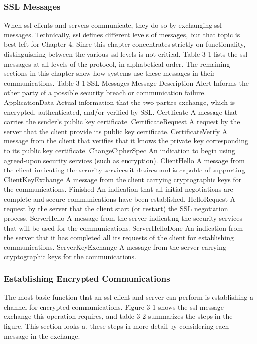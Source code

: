 \subsubsection{SSL Messages}
When ssl clients and servers communicate, they do so by exchanging ssl messages. Technically, ssl defines different levels of messages,
but that topic is best left for Chapter 4. Since this chapter concentrates strictly on functionality, distinguishing between the various ssl
levels is not critical. Table 3-1 lists the ssl messages at all levels of the
protocol, in alphabetical order. The remaining sections in this chapter
show how systems use these messages in their communications.
Table 3-1 SSL Messages
Message Description
Alert Informs the other party of a possible security
breach or communication failure.
ApplicationData Actual information that the two parties exchange, which is encrypted, authenticated,
and/or verified by SSL.
Certificate A message that carries the sender’s public key
certificate.
CertificateRequest A request by the server that the client provide
its public key certificate.
CertificateVerify A message from the client that verifies that it
knows the private key corresponding to its public key certificate.
ChangeCipherSpec An indication to begin using agreed-upon security services (such as encryption).
ClientHello A message from the client indicating the security services it desires and is capable of supporting.
ClientKeyExchange A message from the client carrying cryptographic keys for the communications.
Finished An indication that all initial negotiations are
complete and secure communications have
been established.
HelloRequest A request by the server that the client start (or
restart) the SSL negotiation process.
ServerHello A message from the server indicating the security services that will be used for the communications.
ServerHelloDone An indication from the server that it has completed all its requests of the client for establishing communications.
ServerKeyExchange A message from the server carrying cryptographic keys for the communications.

\subsubsection{Establishing Encrypted Communications}
The most basic function that an ssl client and server can perform is
establishing a channel for encrypted communications. Figure 3-1
shows the ssl message exchange this operation requires, and table 3-2
summarizes the steps in the figure. This section looks at these steps
in more detail by considering each message in the exchange.

